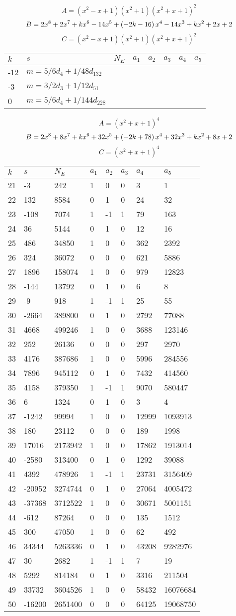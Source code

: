 \documentclass{amsart}
\begin{document}
$$A=(x^2
 - x
 + 1)(x^2
 + 1)(x^2
 + x
 + 1)^{2}$$
$$B=2\*x^8
 + 2\*x^7
 + k\*x^6
 - 14\*x^5
 + \left(-2\*k
 - 16\right) \*x^4
 - 14\*x^3
 + k\*x^2
 + 2\*x
 + 2$$
$$C=(x^2
 - x
 + 1)(x^2
 + 1)(x^2
 + x
 + 1)^{2}$$
\begin{longtable}{|l|l|l|lllll|}
\hline
$k$ & $s$ & $N_E$ & $a_1$ & $a_2$ & $a_3$ & $a_4$ & $a_5$\\
\hline
-12&$m=5/6d_{4}+1/48d_{132}$&&\multicolumn{5}{c|}{}\\
-3&$m=3/2d_{3}+1/12d_{51}$&&\multicolumn{5}{c|}{}\\
0&$m=5/6d_{4}+1/144d_{228}$&&\multicolumn{5}{c|}{}\\
\hline
\end{longtable}
$$A=(x^2
 + x
 + 1)^{4}$$
$$B=2\*x^8
 + 8\*x^7
 + k\*x^6
 + 32\*x^5
 + \left(-2\*k
 + 78\right) \*x^4
 + 32\*x^3
 + k\*x^2
 + 8\*x
 + 2$$
$$C=(x^2
 + x
 + 1)^{4}$$
\begin{longtable}{|l|l|l|lllll|}
\hline
$k$ & $s$ & $N_E$ & $a_1$ & $a_2$ & $a_3$ & $a_4$ & $a_5$\\
\hline
21&-3&242&1&0&0&3&1\\
22&132&8584&0&1&0&24&32\\
23&-108&7074&1&-1&1&79&163\\
24&36&5144&0&1&0&12&16\\
25&486&34850&1&0&0&362&2392\\
26&324&36072&0&0&0&621&5886\\
27&1896&158074&1&0&0&979&12823\\
28&-144&13792&0&1&0&6&8\\
29&-9&918&1&-1&1&25&55\\
30&-2664&389800&0&1&0&2792&77088\\
31&4668&499246&1&0&0&3688&123146\\
32&252&26136&0&0&0&297&2970\\
33&4176&387686&1&0&0&5996&284556\\
34&7896&945112&0&1&0&7432&414560\\
35&4158&379350&1&-1&1&9070&580447\\
36&6&1324&0&1&0&3&4\\
37&-1242&99994&1&0&0&12999&1093913\\
38&180&23112&0&0&0&189&1998\\
39&17016&2173942&1&0&0&17862&1913014\\
40&-2580&313400&0&1&0&1292&39088\\
41&4392&478926&1&-1&1&23731&3156409\\
42&-20952&3274744&0&1&0&27064&4005472\\
43&-37368&3712522&1&0&0&30671&5001151\\
44&-612&87264&0&0&0&135&1512\\
45&300&47050&1&0&0&62&492\\
46&34344&5263336&0&1&0&43208&9282976\\
47&30&2682&1&-1&1&7&19\\
48&5292&814184&0&1&0&3316&211504\\
49&33732&3604526&1&0&0&58432&16076684\\
50&-16200&2651400&0&0&0&64125&19068750\\
\hline
\end{longtable}
\end{document}
